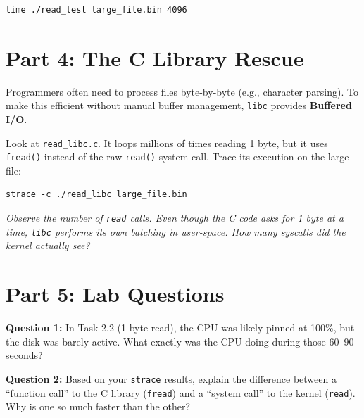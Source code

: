 \documentclass[11pt, a4paper]{article}
\begin{document}
\begin{verbatim}
time ./read_test large_file.bin 4096
\end{verbatim}

\section*{Part 4: The C Library Rescue}
Programmers often need to process files byte-by-byte (e.g., character parsing). To make this efficient without manual buffer management, \texttt{libc} provides \textbf{Buffered I/O}. 

Look at \texttt{read\_libc.c}. It loops millions of times reading 1 byte, but it uses \texttt{fread()} instead of the raw \texttt{read()} system call. Trace its execution on the large file:

\begin{verbatim}
strace -c ./read_libc large_file.bin
\end{verbatim}

\textit{Observe the number of \texttt{read} calls. Even though the C code asks for 1 byte at a time, \texttt{libc} performs its own batching in user-space. How many syscalls did the kernel actually see?}

\section*{Part 5: Lab Questions}

\noindent \textbf{Question 1:} In Task 2.2 (1-byte read), the CPU was likely pinned at 100\%, but the disk was barely active. What exactly was the CPU doing during those 60--90 seconds?

\vspace{0.2cm}

\noindent \textbf{Question 2:} Based on your \texttt{strace} results, explain the difference between a ``function call'' to the C library (\texttt{fread}) and a ``system call'' to the kernel (\texttt{read}). Why is one so much faster than the other?
\end{document}
